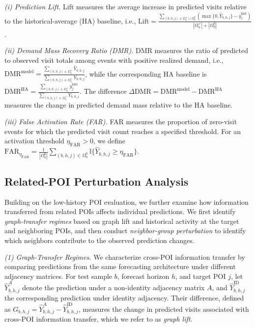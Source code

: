 \documentclass[preprint,authoryear,11pt]{elsarticle}
\theoremstyle{definition}
\begin{document}
\textit{(i) Prediction Lift.}
Lift measures the average increase in predicted visits relative to the historical-average (HA) baseline, 
i.e.,
\(\mathrm{Lift}=\frac{\sum_{(b,h,j)\in\Omega_0^+\cup\Omega_0^0}(\max\{0,\hat Y_{b,h,j}\}-\bar y_j^{\mathrm{hist}})}{|\Omega_0^+|+|\Omega_0^0|}\).

\textit{(ii) Demand Mass Recovery Ratio (DMR).}
DMR measures the ratio of predicted to observed visit totals among events with positive realized demand,
i.e., 
\(\mathrm{DMR}^{\mathrm{model}}=\frac{\sum_{(b,h,j)\in\Omega_0^+}\hat Y_{b,h,j}}{\sum_{(b,h,j)\in\Omega_0^+}Y_{b,h,j}}\),
while the corresponding HA baseline is
\(\mathrm{DMR}^{\mathrm{HA}}=\frac{\sum_{(b,h,j)\in\Omega_0^+}\bar y_j^{\mathrm{hist}}}{\sum_{(b,h,j)\in\Omega_0^+}Y_{b,h,j}}\).
The difference
\(\Delta\mathrm{DMR}=\mathrm{DMR}^{\mathrm{model}}-\mathrm{DMR}^{\mathrm{HA}}\)
measures the change in predicted demand mass relative to the HA baseline.

\textit{(iii) False Activation Rate (FAR).}
FAR measures the proportion of zero-visit events for which the predicted visit count reaches a specified threshold.
For an activation threshold \(\eta_{\mathrm{FAR}}>0\), we define
\(\mathrm{FAR}_{\eta_{\mathrm{FAR}}}=\frac{1}{|\Omega_0^0|}\sum_{(b,h,j)\in\Omega_0^0}\mathbb{I}\{\hat Y_{b,h,j}\geq\eta_{\mathrm{FAR}}\}\).

\subsection{Related-POI Perturbation Analysis}
\label{subsec:perturbation_method}

Building on the low-history POI evaluation, we further examine how information transferred from related POIs affects individual predictions.
We first identify \textit{graph-transfer regimes} based on graph lift and historical activity at the target and neighboring POIs, and then conduct \textit{neighbor-group perturbation} to identify which neighbors contribute to the observed prediction changes.

\textit{(1) Graph-Transfer Regimes.}
We characterize cross-POI information transfer by comparing predictions from the same forecasting architecture under different adjacency matrices.
For test sample \(b\), forecast horizon \(h\), and target POI \(j\), let \(\hat Y_{b,h,j}^{A}\) denote the prediction under a non-identity adjacency matrix \(A\), and \(\hat Y_{b,h,j}^{\mathrm{ID}}\) the corresponding prediction under identity adjacency.
Their difference, defined as
\(G_{b,h,j}=\hat Y_{b,h,j}^{A}-\hat Y_{b,h,j}^{\mathrm{ID}}\),
measures the change in predicted visits associated with cross-POI information transfer, which we refer to as \textit{graph lift}.
\end{document}
